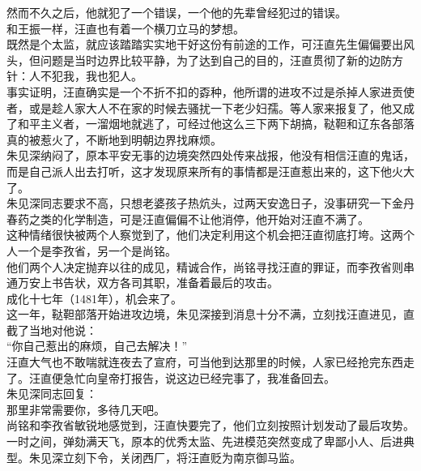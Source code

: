 \begin{multicols}{\theparacolNo}
然而不久之后，他就犯了一个错误，一个他的先辈曾经犯过的错误。\\

和王振一样，汪直也有着一个横刀立马的梦想。\\

既然是个太监，就应该踏踏实实地干好这份有前途的工作，可汪直先生偏偏要出风头，但问题是当时边界比较平静，为了达到自己的目的，汪直贯彻了新的边防方针：人不犯我，我也犯人。\\

事实证明，汪直确实是一个不折不扣的孬种，他所谓的进攻不过是杀掉人家进贡使者，或是趁人家大人不在家的时候去骚扰一下老少妇孺。等人家来报复了，他又成了和平主义者，一溜烟地就逃了，可经过他这么三下两下胡搞，鞑靼和辽东各部落真的被惹火了，不断地到明朝边界找麻烦。\\

朱见深纳闷了，原本平安无事的边境突然四处传来战报，他没有相信汪直的鬼话，而是自己派人出去打听，这才发现原来所有的事情都是汪直惹出来的，这下他火大了。\\

朱见深同志要求不高，只想老婆孩子热炕头，过两天安逸日子，没事研究一下金丹春药之类的化学制造，可是汪直偏偏不让他消停，他开始对汪直不满了。\\

这种情绪很快被两个人察觉到了，他们决定利用这个机会把汪直彻底打垮。这两个人一个是李孜省，另一个是尚铭。\\

他们两个人决定抛弃以往的成见，精诚合作，尚铭寻找汪直的罪证，而李孜省则串通万安上书告状，双方各司其职，准备着最后的攻击。\\

成化十七年（1481年），机会来了。\\

这一年，鞑靼部落开始进攻边境，朱见深接到消息十分不满，立刻找汪直进见，直截了当地对他说：\\

“你自己惹出的麻烦，自己去解决！”\\

汪直大气也不敢喘就连夜去了宣府，可当他到达那里的时候，人家已经抢完东西走了。汪直便急忙向皇帝打报告，说这边已经完事了，我准备回去。\\

朱见深同志回复：\\

那里非常需要你，多待几天吧。\\

尚铭和李孜省敏锐地感觉到，汪直快要完了，他们立刻按照计划发动了最后攻势。一时之间，弹劾满天飞，原本的优秀太监、先进模范突然变成了卑鄙小人、后进典型。朱见深立刻下令，关闭西厂，将汪直贬为南京御马监。\\


\end{multicols}
